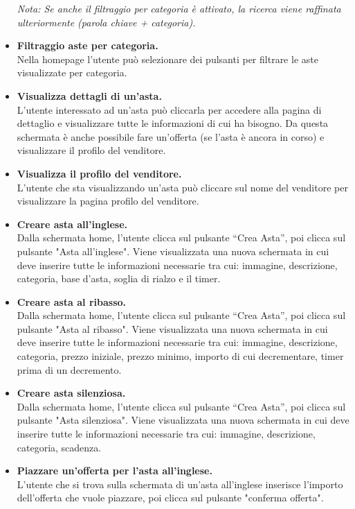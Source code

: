 \begin{itemize}
	      \textit{Nota: Se anche il filtraggio per categoria è attivato, la ricerca viene raffinata ulteriormente (parola chiave + categoria).}

	\item \textbf{Filtraggio aste per categoria.}\\
	      Nella homepage l'utente può selezionare dei pulsanti per filtrare le aste visualizzate per categoria.

	\item \textbf{Visualizza dettagli di un'asta.}\\
	      L'utente interessato ad un'asta può cliccarla per accedere alla pagina di dettaglio e visualizzare tutte le informazioni di cui ha bisogno. Da questa schermata è anche possibile fare un'offerta (se l'asta è ancora in corso) e visualizzare il profilo del venditore.

	\item \textbf{Visualizza il profilo del venditore.}\\
	      L'utente che sta visualizzando un'asta può cliccare sul nome del venditore per visualizzare la pagina profilo del venditore.

	\item \textbf{Creare asta all'inglese.}\\
	      Dalla schermata home, l'utente clicca sul pulsante “Crea Asta”, poi clicca sul pulsante "Asta all'inglese". Viene visualizzata una nuova schermata in cui deve inserire tutte le informazioni necessarie tra cui: immagine, descrizione, categoria, base d'asta, soglia di rialzo e il timer.

	\item \textbf{Creare asta al ribasso.}\\
	      Dalla schermata home, l'utente clicca sul pulsante “Crea Asta”, poi clicca sul pulsante "Asta al ribasso". Viene visualizzata una nuova schermata in cui deve inserire tutte le informazioni necessarie tra cui: immagine, descrizione, categoria, prezzo iniziale, prezzo minimo, importo di cui decrementare, timer prima di un decremento.

	\item \textbf{Creare asta silenziosa.}\\
	      Dalla schermata home, l'utente clicca sul pulsante “Crea Asta”, poi clicca sul pulsante "Asta silenziosa". Viene visualizzata una nuova schermata in cui deve inserire tutte le informazioni necessarie tra cui: immagine, descrizione, categoria, scadenza.

	\item \textbf{Piazzare un'offerta per l'asta all'inglese.}\\
	      L'utente che si trova sulla schermata di un'asta all'inglese inserisce l'importo dell'offerta che vuole piazzare, poi clicca sul pulsante "conferma offerta".


\end{itemize}
